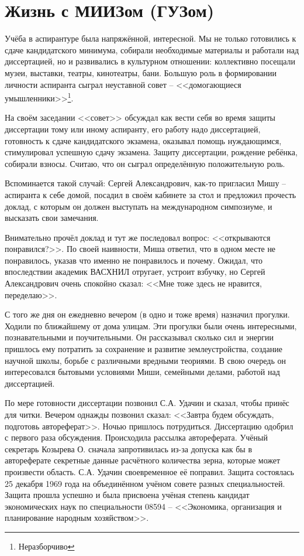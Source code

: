 ﻿\chapter{Жизнь с МИИЗом (ГУЗом)}

Учёба в аспирантуре была напряжённой, интересной. Мы не только готовились к сдаче кандидатского минимума, собирали необходимые материалы и работали над диссертацией, но и развивались в культурном отношении: коллективно посещали музеи, выставки, театры, кинотеатры, бани. Большую роль в формировании личности аспиранта сыграл неуставной совет \--- <<домогающиеся умышленники>>\footnote{Неразборчиво}. 

На своём заседании <<совет>> обсуждал как вести себя во время защиты диссертации тому или иному аспиранту, его работу надо диссертацией, готовность к сдаче кандидатского экзамена, оказывал помощь нуждающимся, стимулировал успешную сдачу экзамена. Защиту диссертации, рождение ребёнка, собирали взносы. Считаю, что он сыграл определённую положительную роль.

Вспоминается такой случай: Сергей Александрович, как-то пригласил Мишу \--- аспиранта к себе домой, посадил в своём кабинете за стол и предложил прочесть доклад, с которым он должен выступать на международном симпозиуме, и высказать свои замечания.

Внимательно прочёл доклад и тут же последовал вопрос: <<открываются понравился?>>. По своей наивности, Миша ответил, что в одном месте не понравилось, указав что именно не понравилось и почему. Ожидал, что впоследствии академик ВАСХНИЛ отругает, устроит взбучку, но Сергей Александрович очень спокойно сказал: <<Мне тоже здесь не нравится, переделаю>>.

С того же дня он ежедневно вечером (в одно и тоже время) назначил прогулки. Ходили по ближайшему от дома улицам. Эти прогулки были очень интересными, познавательными и поучительными. Он рассказывал сколько сил и энергии пришлось ему потратить за сохранение и развитие землеустройства, создание научной школы, борьбе с различными вредными теориями. В свою очередь он интересовался бытовыми условиями Миши, семейными делами, работой над диссертацией.

По мере готовности диссертации позвонил С.А. Удачин и сказал, чтобы принёс для читки. Вечером однажды позвонил сказал: <<Завтра будем обсуждать, подготовь автореферат>>. Ночью пришлось потрудиться. Диссертацию одобрил с первого раза обсуждения. Происходила рассылка автореферата. Учёный секретарь Козырева О. сначала запротивилась из-за допуска как бы в автореферате секретные данные расчётного количества зерна, которые может произвести область. С.А. Удачин своевременное её поправил. Защита состоялась 25 декабря 1969 года на объединённом учёном совете разных специальностей. Защита прошла успешно и была присвоена учёная степень кандидат экономических наук по специальности 08594 \--- <<Экономика, организация и планирование народным хозяйством>>. 

